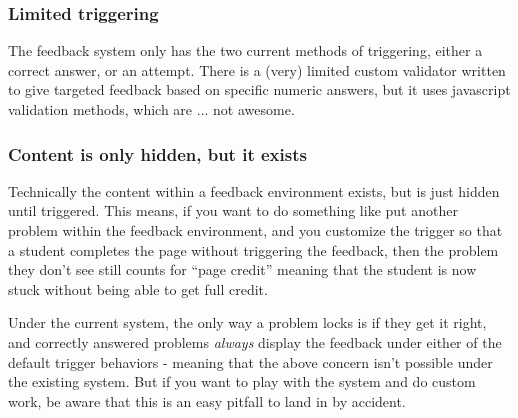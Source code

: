 \documentclass{ximera}
\begin{document}
        \subsubsection*{Limited triggering}
            The feedback system only has the two current methods of triggering, either a correct answer, or an attempt. There is a (very) limited custom validator written to give targeted feedback based on specific numeric answers, but it uses javascript validation methods, which are ... not awesome. 
            
        \subsubsection*{Content is only hidden, but it exists}
            Technically the content within a feedback environment exists, but is just hidden until triggered. This means, if you want to do something like put another problem within the feedback environment, and you customize the trigger so that a student completes the page without triggering the feedback, then the problem they don't see still counts for ``page credit'' meaning that the student is now stuck without being able to get full credit.
            
            Under the current system, the only way a problem locks is if they get it right, and correctly answered problems \textit{always} display the feedback under either of the default trigger behaviors - meaning that the above concern isn't possible under the existing system. But if you want to play with the system and do custom work, be aware that this is an easy pitfall to land in by accident.
    
    
    
\end{document}
